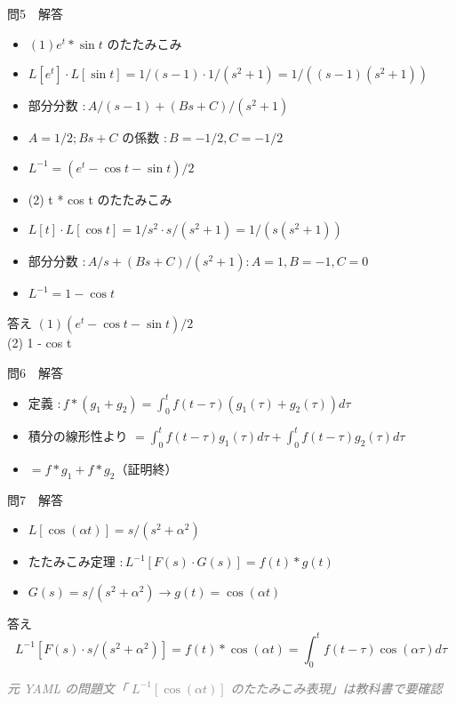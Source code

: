 \documentclass[aspectratio=43,professionalfonts,handout]{beamer}
\begin{document}
\begin{frame}{問5　解答}
  \begin{block}{}
  \begin{itemize}\setlength{\itemsep}{2pt}
    \item $(1) e^t * \sin t$ のたたみこみ
    \item $    L[e^t]\cdot L[\sin t] = 1/(s-1)\cdot1/(s^{2}+1) = 1/((s-1)(s^{2}+1))$
    \item 部分分数 $: A/(s-1) + (Bs+C)/(s^{2}+1)$
    \item $A = 1/2; Bs+C$ の係数 $: B = -1/2, C = -1/2$
    \item $    L^{-1} = (e^t - \cos t - \sin t)/2$
    \item (2) t * cos t のたたみこみ
    \item $    L[t]\cdot L[\cos t] = 1/s^{2}\cdot s/(s^{2}+1) = 1/(s(s^{2}+1))$
    \item 部分分数 $: A/s + (Bs+C)/(s^{2}+1): A=1, B=-1, C=0$
    \item $    L^{-1} = 1 - \cos t$
  \end{itemize}
  \end{block}
  \begin{exampleblock}{答え}
  $(1) (e^t - \cos t - \sin t)/2$\\
  (2) 1 - cos t\\
  \end{exampleblock}
\end{frame}

\begin{frame}{問6　解答}
  \begin{block}{}
  \begin{itemize}\setlength{\itemsep}{2pt}
    \item 定義 $: f*(g_{1}+g_{2}) = \int_{0}^t f(t-\tau)(g_{1}(\tau)+g_{2}(\tau))d\tau$
    \item 積分の線形性より $= \int_{0}^t f(t-\tau)g_{1}(\tau)d\tau + \int_{0}^t f(t-\tau)g_{2}(\tau)d\tau$
    \item $= f*g_{1} + f*g_{2}$（証明終）
  \end{itemize}
  \end{block}
\end{frame}

\begin{frame}{問7　解答}
  \begin{block}{}
  \begin{itemize}\setlength{\itemsep}{2pt}
    \item $L[\cos(\alpha t)] = s/(s^{2}+\alpha^{2})$
    \item たたみこみ定理 $: L^{-1}[F(s)\cdot G(s)] = f(t)*g(t)$
    \item $G(s) = s/(s^{2}+\alpha^{2})  \to  g(t) = \cos(\alpha t)$
  \end{itemize}
  \end{block}
  \begin{exampleblock}{答え}
    \[
    L^{-1}[F(s)\cdot s/(s^{2}+\alpha^{2})] = f(t)*\cos(\alpha t) = \int_{0}^t f(t-\tau)\cos(\alpha\tau)d\tau
  \]
  \end{exampleblock}
  {\footnotesize \textcolor{gray}{\textit{元 YAML の問題文「 $L^{-1}[\cos(\alpha t)]$ のたたみこみ表現」は教科書で要確認}}}
\end{frame}
\end{document}

